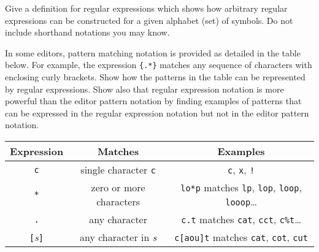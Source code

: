 \begin{questions}


\newenvironment{bnf}{
    \begin{tabbing}
    XXXXXX \= XXXX \= XXXXXXXXXXXXXXXXXXXXXXXXXXXXXXXXXX\kill}{
    \end{tabbing}
    }

\newcommand{\nt}[1]{{\it #1\/}}
\newcommand{\Or}[1]{\ \ $|$ \ \ #1}
\newcommand{\Rule}[2]{{\it #1} \> $\rightarrow$ \> #2}

\question

\begin{subquestions}

\subquestion

Give a definition for regular expressions which shows how
arbitrary regular expressions can be constructed for a
given alphabet (set) of symbols. Do not include shorthand
notations you may know.

\subquestion
        In some editors, pattern matching notation is
        provided as detailed in the table below.
        For example, the expression \verb"{.*}" 
        matches any sequence of characters with enclosing
        curly brackets.
        Show how the patterns in the table can be represented by regular
        expressions. Show also that regular expression notation is
        more powerful than the editor pattern notation by
        finding examples of patterns that can be expressed in the
        regular expression notation but not in the editor pattern
        notation.


\begin{center}
\begin{tabular}{|c|c|c|}        \hline
Expression & Matches & Examples \\ \hline
\verb"c"                & single character \verb"c"      & \verb"c", \verb"x", \verb"!"\\                     
\verb"*"                & zero or more characters        & \verb"lo*p" matches \verb"lp", \verb"lop", \verb"loop", \verb"looop"\ldots\\
\verb"."                & any character                  & \verb"c.t" matches \verb"cat", \verb"cct", \verb"c%t"\ldots\\
\verb"["{\it s\/}\verb"]" & any character in {\it s}     & \verb"c[aou]t"  matches \verb"cat", \verb"cot", \verb"cut"\\
 \hline
\end{tabular}
\end{center}


\end{subquestions}
\end{questions}
